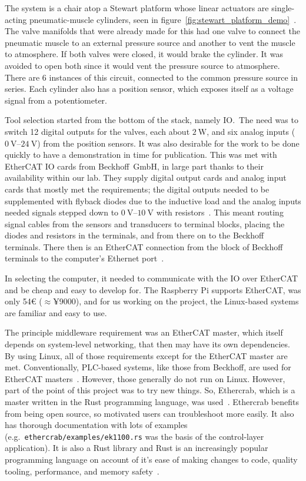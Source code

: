 \documentclass[english,12pt,a4paper,pdftex,eng,utf8]{aaltothesis}
\begin{document}
The system is a chair atop a Stewart platform whose linear actuators are single-acting pneumatic-muscle cylinders, seen in figure~\ref{fig:stewart_platform_demo}~\cite{Stewart1965, Caldwell1995}.  The valve manifolds that were already made for this had one valve to connect the pneumatic muscle to an external pressure source and another to vent the muscle to atmosphere.  If both valves were closed, it would brake the cylinder.  It was avoided to open both since it would vent the pressure source to atmosphere.  There are 6 instances of this circuit, connected to the common pressure source in series.  Each cylinder also has a position sensor, which exposes itself as a voltage signal from a potentiometer.

Tool selection started from the bottom of the stack, namely IO.\  The need was to switch 12 digital outputs for the valves, each about $\qty{2}{\watt}$, and six analog inputs ($\qtyrange[range-units=single,range-phrase=..]{0}{24}{\volt}$) from the position sensors.  It was also desirable for the work to be done quickly to have a demonstration in time for publication.  This was met with EtherCAT IO cards from Beckhoff~GmbH, in large part thanks to their availability within our lab.  They supply digital output cards and analog input cards that mostly met the requirements; the digital outputs needed to be supplemented with flyback diodes due to the inductive load and the analog inputs needed signals stepped down to $\qtyrange[range-units=single,range-phrase=..]{0}{10}{\volt}$ with resistors~\cite{BeckhoffEL2042,BeckhoffEL3062}.  This meant routing signal cables from the sensors and transducers to terminal blocks, placing the diodes and resistors in the terminals, and from there on to the Beckhoff terminals.  There then is an EtherCAT connection from the block of Beckhoff terminals to the computer's Ethernet port~\cite{BeckhoffEK1100}.

In selecting the computer, it needed to communicate with the IO over EtherCAT and be cheap and easy to develop for.  The Raspberry Pi supports EtherCAT, was only 54€ ($\approx$¥9000), and for us working on the project, the Linux-based systems are familiar and easy to use.

The principle middleware requirement was an EtherCAT master, which itself depends on system-level networking, that then may have its own dependencies.  By using Linux, all of those requirements except for the EtherCAT master are met.  Conventionally, PLC-based systems, like those from Beckhoff, are used for EtherCAT masters~\cite{BeckhoffTwinCAT}.  However, those generally do not run on Linux.  However, part of the point of this project was to try new things.  So, Ethercrab, which is a master written in the Rust programming language, was used~\cite{Ethercrab}.  Ethercrab benefits from being open source, so motivated users can troubleshoot more easily.  It also has thorough documentation with lots of examples (e.g.\ \verb|ethercrab/examples/ek1100.rs| was the basis of the control-layer application).  It is also a Rust library and Rust is an increasingly popular programming language on account of it's ease of making changes to code, quality tooling, performance, and memory safety~\cite{RustHomePage}.
\end{document}
